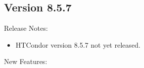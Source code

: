 \subsection*{\label{sec:New-8-5-7}Version 8.5.7}

\noindent Release Notes:

\begin{itemize}

\item HTCondor version 8.5.7 not yet released.

\end{itemize}


\noindent New Features:

